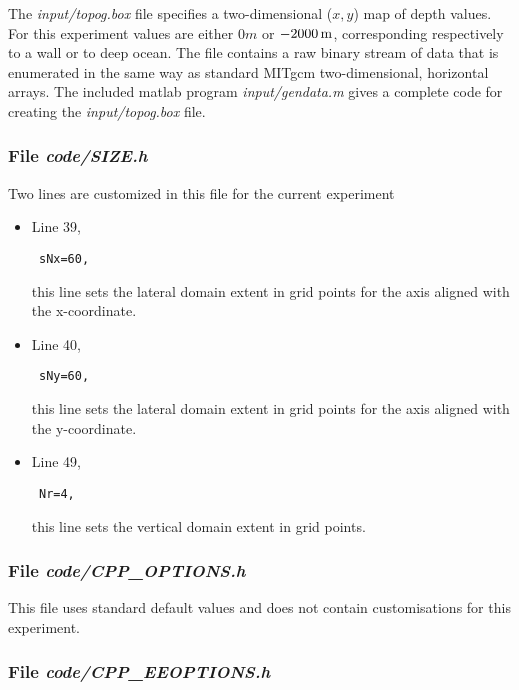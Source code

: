 {The {\it input/topog.box} file specifies a two-dimensional ($x,y$) 
map of depth values. For this experiment values are either
$0m$ or $-2000\,{\rm m}$, corresponding respectively to a wall or to deep
ocean. The file contains a raw binary stream of data that is enumerated
in the same way as standard MITgcm two-dimensional, horizontal arrays.
The included matlab program {\it input/gendata.m} gives a complete
code for creating the {\it input/topog.box} file.

\subsubsection{File {\it code/SIZE.h}}

Two lines are customized in this file for the current experiment

\begin{itemize}

\item Line 39, 
\begin{verbatim} sNx=60, \end{verbatim} this line sets
the lateral domain extent in grid points for the
axis aligned with the x-coordinate.

\item Line 40, 
\begin{verbatim} sNy=60, \end{verbatim} this line sets
the lateral domain extent in grid points for the
axis aligned with the y-coordinate.

\item Line 49, 
\begin{verbatim} Nr=4,   \end{verbatim} this line sets
the vertical domain extent in grid points.

\end{itemize}

\begin{small}

\end{small}

\subsubsection{File {\it code/CPP\_OPTIONS.h}}

This file uses standard default values and does not contain
customisations for this experiment.


\subsubsection{File {\it code/CPP\_EEOPTIONS.h}}

}
